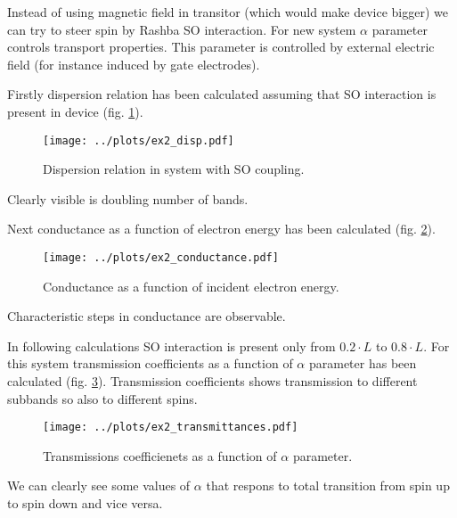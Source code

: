 \documentclass[a4paper, 12pt]{article}
\begin{document}
Instead of using magnetic field in transitor (which would make device bigger) we can try to steer spin by Rashba SO interaction.
For new system $\alpha$ parameter controls transport properties. 
This parameter is controlled by external electric field (for instance induced by gate electrodes).

Firstly dispersion relation has been calculated assuming that SO interaction is present in device (fig. \ref{fig:ex2_disp}).

\begin{figure}[h]
    \begin{center}
        \texttt{[image: ../plots/ex2\_disp.pdf]}
    \end{center}
    \caption{Dispersion relation in system with SO coupling.}
    \label{fig:ex2_disp}
\end{figure}

Clearly visible is doubling number of bands.

Next conductance as a function of electron energy has been calculated (fig. \ref{fig:ex2_cond}).

\begin{figure}[h]
    \begin{center}
        \texttt{[image: ../plots/ex2\_conductance.pdf]}
    \end{center}
    \caption{Conductance as a function of incident electron energy.}
    \label{fig:ex2_cond}
\end{figure}

Characteristic steps in conductance are observable.

In following calculations SO interaction is present only from $0.2 \cdot L$ to $0.8 \cdot L$.
For this system transmission coefficients as a function of $\alpha$ parameter  has been calculated (fig. \ref{fig:ex2_trans}).
Transmission coefficients shows transmission to different subbands so also to different spins.

\begin{figure}[H]
    \begin{center}
        \texttt{[image: ../plots/ex2\_transmittances.pdf]}
    \end{center}
    \caption{Transmissions coefficienets as a function of $\alpha$ parameter.}
    \label{fig:ex2_trans}
\end{figure}

We can clearly see some values of $\alpha$ that respons to total transition from spin up to spin down and vice versa.
\end{document}
